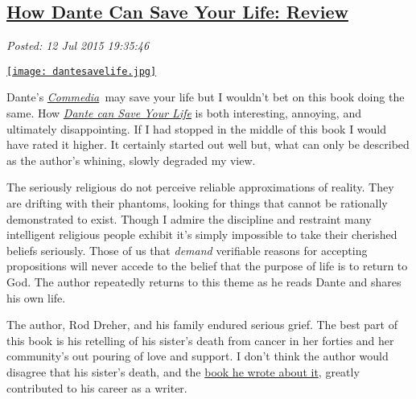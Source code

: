 %

\subsection*{\href{https://bakerjd99.wordpress.com/2015/07/12/how-dante-can-your-life-review/}{How Dante Can Save Your Life: Review}}


\noindent\emph{Posted: 12 Jul 2015 19:35:46}
\vspace{6pt}

\captionsetup[floatingfigure]{labelformat=empty}
\begin{floatingfigure}[r]{0.23\textwidth}
\centering
\href{http://www.barnesandnoble.com/w/how-dante-can-save-your-life-rod-dreher/1121191388?ean=9781941393772}{\texttt{[image: dantesavelife.jpg]}}
\label{fig:5093X0}
\end{floatingfigure}Dante's
\emph{\href{http://www.gutenberg.org/files/8800/8800-h/8800-h.htm}{Commedia}~}may
save your life but I wouldn't bet on this book doing the same. How
\emph{\href{http://www.barnesandnoble.com/w/how-dante-can-save-your-life-rod-dreher/1121191388?ean=9781941393772}{Dante
can Save Your Life}} is both interesting, annoying, and ultimately
disappointing. If I had stopped in the middle of this book I would have
rated it higher. It certainly started out well but, what can only be
described as the author's whining, slowly degraded my view.

The seriously religious do not perceive reliable approximations of
reality. They are drifting with their phantoms, looking for things that
cannot be rationally demonstrated to exist. Though I admire the
discipline and restraint many intelligent religious people exhibit it's
simply impossible to take their cherished beliefs seriously. Those of us
that \emph{demand} verifiable reasons for accepting propositions will
never accede to the belief that the purpose of life is to return to God.
The author repeatedly returns to this theme as he reads Dante and shares
his own life.

The author, Rod Dreher, and his family endured serious grief. The best
part of this book is his retelling of his sister's death from cancer in
her forties and her community's out pouring of love and support. I don't
think the author would disagree that his sister's death, and the
\href{http://www.barnesandnoble.com/w/the-little-way-of-ruthie-leming-rod-dreher/1112412048?ean=9781455521913}{book
he wrote about it}, greatly contributed to his career as a writer.

